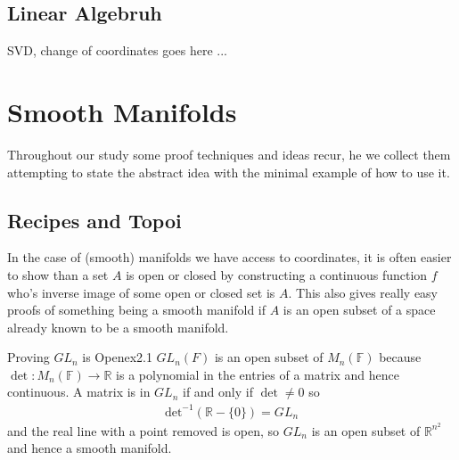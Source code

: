 \documentclass[11pt]{book}
\begin{document}
	\section{Linear Algebruh}
	SVD, change of coordinates goes here ...
	
	
	\chapter{Smooth Manifolds}
	
	Throughout our study some proof techniques and ideas recur, he we collect them attempting to state the abstract idea with the minimal example of how to use it.
	
	\section{Recipes and Topoi}
	In the case of (smooth) manifolds we have access to coordinates, it is often easier to show than a set $A$ is open or closed by constructing a continuous function $f$ who's inverse image of some open or closed set is $A$. This also gives really easy proofs of something being a smooth manifold if $A$ is an open subset of a space already known to be a smooth manifold.
	
	
	
	
	\begin{theo}{Proving $GL_n$ is Open}{ex2.1}
		$GL_n(F)$ is an open subset of $M_n(\mathbb{F})$ because $\det: M_n(\mathbb{F}) \rightarrow \mathbb{R}$ is a polynomial in the entries of a matrix and hence continuous. A matrix is in $GL_n$ if and only if $\det \neq 0$ so 
		\begin{align*}
			\text{det}^{-1}(\mathbb{R} - \{0\}) = GL_n
		\end{align*} 
		and the real line with a point removed is open, so $GL_n$ is an open subset of $\mathbb{R}^{n^2}$ and hence a smooth manifold. 
	\end{theo}
	
	
	
	
	
	
	
	
\end{document}
